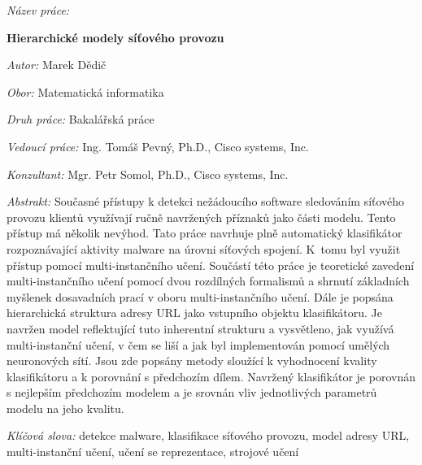 \begin{onehalfspace}
	\noindent \textit{Název práce:}

	\noindent \textbf{Hierarchické modely síťového provozu}
\end{onehalfspace}

\bigskip

\noindent \textit{Autor:} Marek Dědič

\bigskip

\noindent \textit{Obor:} Matematická informatika

\bigskip

\noindent \textit{Druh práce:} Bakalářská práce

\bigskip

\noindent \textit{Vedoucí práce:} Ing. Tomáš Pevný, Ph.D., Cisco systems, Inc.

\bigskip

\noindent \textit{Konzultant:} Mgr. Petr Somol, Ph.D., Cisco systems, Inc.

\bigskip

\noindent \textit{Abstrakt:}
Současné přístupy k detekci nežádoucího software sledováním síťového provozu klientů využívají ručně navržených příznaků jako části modelu. Tento přístup má několik nevýhod. Tato práce navrhuje plně automatický klasifikátor rozpoznávající aktivity malware na úrovni síťových spojení. K~tomu byl využit přístup pomocí multi-instančního učení. Součástí této práce je teoretické zavedení multi-instančního učení pomocí dvou rozdílných formalismů a shrnutí základních myšlenek dosavadních prací v oboru multi-instančního učení. Dále je popsána hierarchická struktura adresy URL jako vstupního objektu klasifikátoru. Je navržen model reflektující tuto inherentní strukturu a vysvětleno, jak využívá multi-instanční učení, v čem se liší a jak byl implementován pomocí umělých neuronových sítí. Jsou zde popsány metody sloužící k vyhodnocení kvality klasifikátoru a k porovnání s předchozím dílem. Navržený klasifikátor je porovnán s nejlepším předchozím modelem a je srovnán vliv jednotlivých parametrů modelu na jeho kvalitu.

\bigskip

\noindent \textit{Klíčová slova:}
detekce malware, klasifikace síťového provozu, model adresy URL, multi-instanční učení, učení se reprezentace, strojové učení

\vfill

